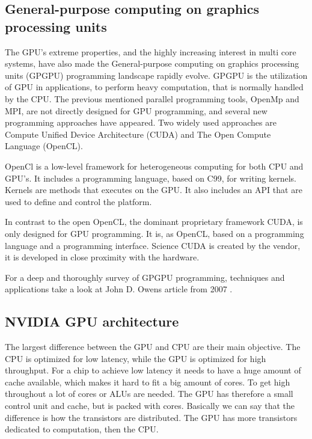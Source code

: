 \subsection{General-purpose computing on graphics processing units} %
\label{ssub:general_purpose_computing_on_graphics_processing_units}

The GPU's extreme properties, and the highly increasing interest in multi core systems, have also made the General-purpose computing on graphics processing units (GPGPU) programming landscape rapidly evolve. GPGPU is the utilization of GPU in applications, to perform heavy computation, that is normally handled by the CPU\@. The previous mentioned parallel programming tools, OpenMp and MPI, are not  directly designed for GPU programming, and several new programming approaches have appeared. Two widely used approaches are Compute Unified Device Architecture (CUDA) and The Open Compute Language (OpenCL).

OpenCl is a low-level framework for heterogeneous computing for both CPU and GPU's. It includes a programming language, based on C99, for writing kernels. Kernels are methods that executes on the GPU\@. It also includes an API that are used to define and control the platform.

In contrast to the open OpenCL, the dominant proprietary framework CUDA\@, is only designed for GPU programming. It is, as OpenCL, based on a programming language and a programming interface. Science CUDA is created by the vendor, it is developed in close proximity with the hardware.

For a deep and thoroughly survey of GPGPU programming, techniques and applications take a look at John D. Owens article from 2007 \citep{Owens:2007:ASO}.

\subsection{NVIDIA GPU architecture} %
\label{ssub:nvidia_gpu_architecture}

The largest difference between the GPU and CPU are their main objective. The CPU is optimized for low latency, while the GPU is optimized for high throughput. For a chip to achieve low latency it needs to have a huge amount of cache available, which makes it hard to fit a big amount of cores. To get high throughout a lot of cores or ALUs are needed. The GPU has therefore a small control unit and cache, but is packed with cores. Basically we can say that the difference is how the transistors are distributed. The GPU has more transistors dedicated to computation, then the CPU\@.

